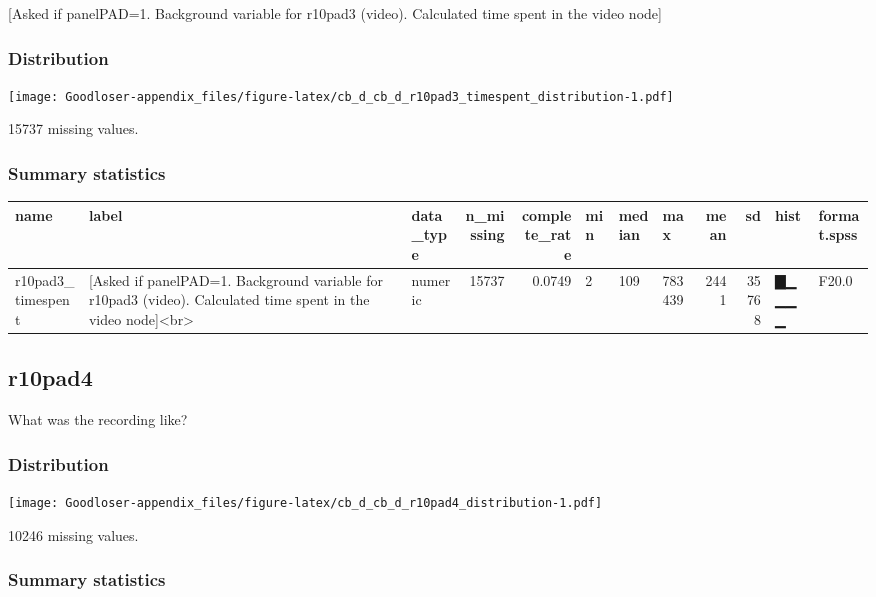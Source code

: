 \documentclass[
]{book}
\begin{document}
{[}Asked if panelPAD=1. Background variable for r10pad3 (video). Calculated time spent in the video node{]}

\hypertarget{r10pad3_timespent_distribution}{%
\subsubsection{Distribution}\label{r10pad3_timespent_distribution}}

\texttt{[image: Goodloser-appendix\_files/figure-latex/cb\_d\_cb\_d\_r10pad3\_timespent\_distribution-1.pdf]}

15737 missing values.

\hypertarget{r10pad3_timespent_summary}{%
\subsubsection{Summary statistics}\label{r10pad3_timespent_summary}}

\begin{tabular}{l|l|l|r|r|l|l|l|r|r|l|l}
\hline
name & label & data_type & n_missing & complete_rate & min & median & max & mean & sd & hist & format.spss\\
\hline
r10pad3_timespent & [Asked if panelPAD=1. Background variable for r10pad3 (video). Calculated time spent in the video node]<br> & numeric & 15737 & 0.0749 & 2 & 109 & 783439 & 2441 & 35768 & ▇▁▁▁▁ & F20.0\\
\hline
\end{tabular}

\hypertarget{r10pad4}{%
\subsection{r10pad4}\label{r10pad4}}

What was the recording like?

\hypertarget{r10pad4_distribution}{%
\subsubsection{Distribution}\label{r10pad4_distribution}}

\texttt{[image: Goodloser-appendix\_files/figure-latex/cb\_d\_cb\_d\_r10pad4\_distribution-1.pdf]}

10246 missing values.

\hypertarget{r10pad4_summary}{%
\subsubsection{Summary statistics}\label{r10pad4_summary}}
\end{document}
